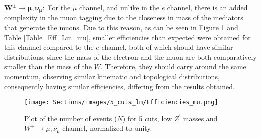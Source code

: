 \begin{table}[ht!]
\centering
\caption{Table of number of events ($\mathcal{N}$) of the five cuts applied to the events for the $W^{\pm} \rightarrow e, \nu_e$ channel for low $Z^{\prime}$ masses.}
\label{Table_Num_Lm_e}
\end{table}

$\bm{W^{\pm} \rightarrow \mu, \nu_{\mu}:}$ For the $\mu$ channel, and unlike in the $e$ channel, there is an added complexity in the muon tagging due to the closeness in mass of the mediators that generate the muons. Due to this reason, as can be seen in Figure \ref{5cutsLm_Eff_mu} and Table \ref{Table_Eff_Lm_mu}, smaller efficiencies than expected were obtained for this channel compared to the $e$ channel, both of which should have similar distributions, since the mass of the electron and the muon are both comparatively smaller than the mass of the $W$. Therefore, they should carry around the same momentum, observing similar kinematic and topological distributions, consequently having similar efficiencies, differing from the results obtained.

\begin{figure}[ht!]
    \centering
    \texttt{[image: Sections/images/5\_cuts\_lm/Efficiencies\_mu.png]}
    \caption{Plot of the number of events ($N$) for 5 cuts, low $Z^{\prime}$ masses and $W^{\pm}\rightarrow \mu, \nu_{\mu}$ channel, normalized to unity.}
    \label{5cutsLm_Eff_mu}
\end{figure}

